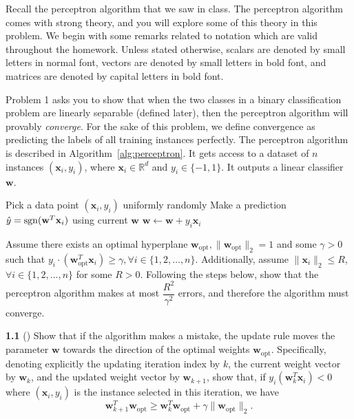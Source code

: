 Recall the perceptron algorithm that we saw in class. The perceptron algorithm comes with strong theory, and you will explore some of this theory in this problem. We begin with some remarks related to notation which are valid throughout the homework. Unless stated otherwise, scalars are denoted by small letters in normal font, vectors are denoted by small letters in bold font, and matrices are denoted by capital letters in bold font. 

Problem 1 asks you to show that when the two classes in a binary classification problem are linearly separable (defined later), then the perceptron algorithm will provably \emph{converge}. For the sake of this problem, we define convergence as predicting the labels of all training instances perfectly. The perceptron algorithm is described in Algorithm~\ref{alg:perceptron}. It gets access to a dataset of $n$ instances $(\mathbf{x}_i, y_i)$, where $\mathbf{x}_i \in \mathbb{R}^d$ and $y_i \in \{-1, 1\}$. It outputs a linear classifier $\mathbf{w}$. 
\begin{algorithm}
\caption{Perceptron}\label{alg:perceptron}
\begin{algorithmic}
\State Pick a data point $(\mathbf{x}_i, y_i)$ uniformly randomly
\State Make a prediction $\hat{y} =\operatorname{sgn}(\mathbf{w}^T\mathbf{x}_i)$ using current $\mathbf{w}$
    \State $\mathbf{w} \gets \mathbf{w} + y_i\mathbf{x}_i$
\EndIf
\EndWhile
\end{algorithmic}
\end{algorithm}

Assume there exists an optimal hyperplane $\mathbf{w}_{\text{opt}}, \|\mathbf{w}_{\text{opt}}\|_2=1$ and some $\gamma >0$ such that $y_i\cdot (\mathbf{w}_{\text{opt}}^T\mathbf{x}_i) \geq \gamma, \forall i \in \{1, 2, \dots, n\}$. Additionally, assume $\|\mathbf{x}_i\|_2 \leq R$, $\forall i \in \{1, 2, ..., n\}$ for some $R>0$. Following the steps below, show that the perceptron algorithm makes at most $\dfrac{R^2}{\gamma^2}$ errors, and therefore the algorithm must converge.

\textbf{1.1} () Show that if the algorithm makes a mistake, the update rule moves the parameter $\mathbf{w}$ towards the direction of the optimal weights $\mathbf{w}_{\text{opt}}$. Specifically, denoting explicitly the updating iteration index by $k$, the current weight
vector by $\mathbf{w}_k$, and the updated weight vector by $\mathbf{w}_{k+1}$, show that, if $y_i(\mathbf{w}_{k}^T\mathbf{x}_i) < 0$ where $(\mathbf{x}_i,y_i)$ is the instance selected in this iteration, we have
\begin{equation}
    \mathbf{w}_{k+1}^T\mathbf{w}_{\text{opt}} \geq \mathbf{w}_{k}^T\mathbf{w}_{\text{opt}} + \gamma \|\mathbf{w}_{\text{opt}}\|_2.
\end{equation}

